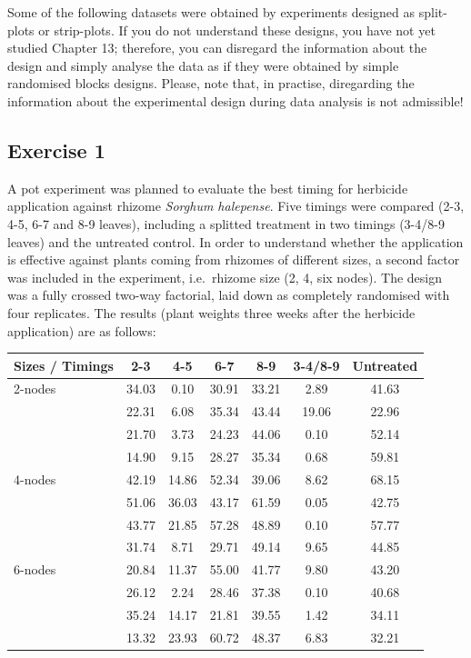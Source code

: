 \documentclass[a4paper,12pt,oneside]{book}
\begin{document}
Some of the following datasets were obtained by experiments designed as split-plots or strip-plots. If you do not understand these designs, you have not yet studied Chapter 13; therefore, you can disregard the information about the design and simply analyse the data as if they were obtained by simple randomised blocks designs. Please, note that, in practise, diregarding the information about the experimental design during data analysis is not admissible!

\hypertarget{exercise-1-6}{%
\subsection{Exercise 1}\label{exercise-1-6}}

A pot experiment was planned to evaluate the best timing for herbicide application against rhizome \emph{Sorghum halepense}. Five timings were compared (2-3, 4-5, 6-7 and 8-9 leaves), including a splitted treatment in two timings (3-4/8-9 leaves) and the untreated control. In order to understand whether the application is effective against plants coming from rhizomes of different sizes, a second factor was included in the experiment, i.e.~rhizome size (2, 4, six nodes). The design was a fully crossed two-way factorial, laid down as completely randomised with four replicates. The results (plant weights three weeks after the herbicide application) are as follows:

\begin{longtable}[]{@{}lcccccc@{}}
\toprule
Sizes / Timings & 2-3 & 4-5 & 6-7 & 8-9 & 3-4/8-9 & Untreated \\
\midrule
\endhead
2-nodes & 34.03 & 0.10 & 30.91 & 33.21 & 2.89 & 41.63 \\
& 22.31 & 6.08 & 35.34 & 43.44 & 19.06 & 22.96 \\
& 21.70 & 3.73 & 24.23 & 44.06 & 0.10 & 52.14 \\
& 14.90 & 9.15 & 28.27 & 35.34 & 0.68 & 59.81 \\
4-nodes & 42.19 & 14.86 & 52.34 & 39.06 & 8.62 & 68.15 \\
& 51.06 & 36.03 & 43.17 & 61.59 & 0.05 & 42.75 \\
& 43.77 & 21.85 & 57.28 & 48.89 & 0.10 & 57.77 \\
& 31.74 & 8.71 & 29.71 & 49.14 & 9.65 & 44.85 \\
6-nodes & 20.84 & 11.37 & 55.00 & 41.77 & 9.80 & 43.20 \\
& 26.12 & 2.24 & 28.46 & 37.38 & 0.10 & 40.68 \\
& 35.24 & 14.17 & 21.81 & 39.55 & 1.42 & 34.11 \\
& 13.32 & 23.93 & 60.72 & 48.37 & 6.83 & 32.21 \\
\bottomrule
\end{longtable}
\end{document}
